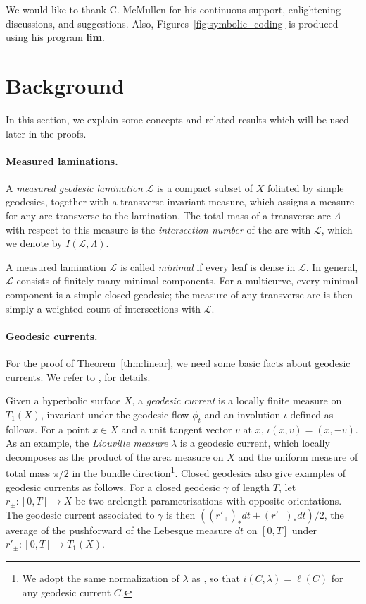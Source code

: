 \documentclass[11pt]{article} %
\theoremstyle{plain}
\theoremstyle{definition}
\numberwithin{equation}{section}
\begin{document}
We would like to thank C. McMullen for his continuous support, enlightening discussions, and suggestions. Also, Figures~\ref{fig:symbolic_coding} is produced using his program \textbf{lim}.%

\section{Background}\label{sec:background}
In this section, we explain some concepts and related results which will be used later in the proofs.

\paragraph{Measured laminations.}
 A \emph{measured geodesic lamination} $\mathcal{L}$ is a compact subset of $X$ foliated by simple geodesics, together with a transverse invariant measure, which assigns a measure for any arc transverse to the lamination. The total mass of a transverse arc $\Lambda$ with respect to this measure is the \emph{intersection number} of the arc with $\mathcal{L}$, which we denote by $I(\mathcal{L},\Lambda)$.

A measured lamination $\mathcal{L}$ is called \emph{minimal} if every leaf is dense in $\mathcal{L}$. In general, $\mathcal{L}$ consists of finitely many minimal components. For a multicurve, every minimal component is a simple closed geodesic; the measure of any transverse arc is then simply a weighted count of intersections with $\mathcal{L}$.

\paragraph{Geodesic currents.}
For the proof of Theorem~\ref{thm:linear}, we need some basic facts about geodesic currents. We refer to \cite{Bon.gc}, \cite{Bon.Tch} for details.

Given a hyperbolic surface $X$, a \emph{geodesic current} is a locally finite measure on $T_1(X)$, invariant under the geodesic flow $\phi_t$ and an involution $\iota$ defined as follows. For a point $x\in X$ and a unit tangent vector $v$ at $x$, $\iota(x,v)=(x,-v)$. As an example, the \emph{Liouville measure} $\lambda$ is a geodesic current, which locally decomposes as the product of the area measure on $X$ and the uniform measure of total mass $\pi/2$ in the bundle direction\footnote{We adopt the same normalization of $\lambda$ as \cite{Bon.gc}, so that $i(C,\lambda)=\ell(C)$ for any geodesic current $C$.}. Closed geodesics also give examples of geodesic currents as follows. For a closed geodesic $\gamma$ of length $T$, let $r_\pm:[0,T]\to X$ be two arclength parametrizations with opposite orientations. The geodesic current associated to $\gamma$ is then $((r'_+)_*dt+(r'_-)_*dt)/2$, the average of the pushforward of the Lebesgue measure $dt$ on $[0,T]$ under $r'_\pm:[0,T]\to T_1(X)$.
\end{document}
